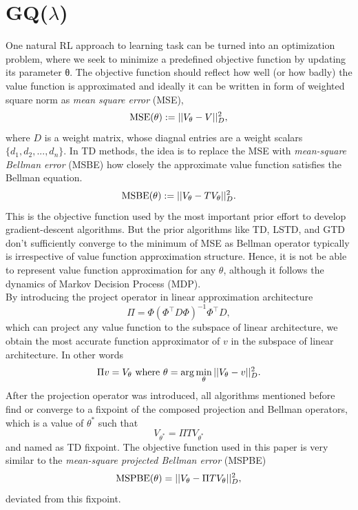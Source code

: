 \documentclass[conference]{IEEEtran}
\begin{document}
\section{GQ($\lambda$)}
One natural RL approach to learning task can be turned into an optimization problem, where we seek to minimize a predefined objective function by updating its parameter θ. The objective function should reflect how well (or how badly) the value function is approximated and ideally it can be written in form of weighted square norm as \textit{mean square error} (\textup{MSE}),
\begin{equation}
    \textup{MSE}(\theta):=||V_\theta-V||^2_D, 
\end{equation}
where $D$ is a weight matrix, whose diagnal entries are a weight scalars $\{d_1, d_2,..., d_n\}$.
In TD methods, the idea is to replace the \textup{MSE} with \textit{mean-square Bellman error} (\textup{MSBE}) \cite{baird1995residual} \cite{baird1999reinforcement} how closely the approximate value function satisfies the Bellman equation.
\begin{equation}
    \textup{MSBE}(\theta):=||V_\theta-TV_\theta||^2_D.
\end{equation}
This is the objective function used by the most important prior effort to develop gradient-descent algorithms. But the prior algorithms like TD, LSTD, and GTD don't sufficiently converge to the minimum of \textup{MSE} as Bellman operator typically is irrespective of  value function approximation structure. Hence, it is not be able to represent value function approximation for any $\theta$, although it follows the dynamics of Markov Decision Process (MDP).\\
By introducing the project operator in linear approximation architecture
\begin{equation}
  \Pi = \Phi(\Phi^\top D\Phi)^{-1}\Phi^\top D ,
\end{equation}
which can project any value function to the subspace of linear architecture, we obtain the most accurate function approximator of $v$ in the subspace of linear architecture. In other words
\begin{equation}
  \Pi v = V_\theta \ \textup{where}\ \theta = \arg \min_\theta||V_\theta-v||^2_D.
\end{equation}
After the projection operator was introduced, all algorithms mentioned before find or converge to a fixpoint of the composed projection and Bellman operators, which is a value of $\theta^*$ such that
\begin{equation}
  V_{\theta^*} = \Pi TV_{\theta^*}
\end{equation}
and named as TD fixpoint. The objective function used in this paper is very similar to the \textit{mean-square projected Bellman error} (\textup{MSPBE})
\begin{equation} 
  \textup{MSPBE}(\theta)=||V_{\theta}-\Pi TV_{\theta}||^2_D,
\end{equation}
deviated from this fixpoint.\\
\end{document}

